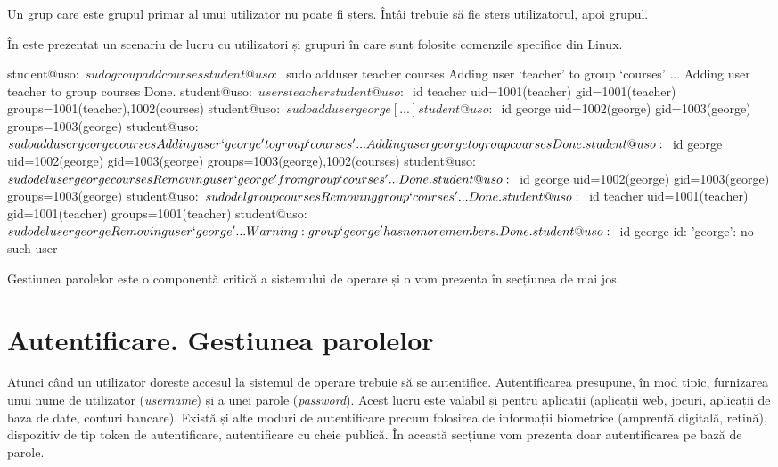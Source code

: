 Un grup care este grupul primar al unui utilizator nu poate fi șters. Întâi trebuie să fie șters utilizatorul, apoi grupul.

În  este prezentat un scenariu de lucru cu utilizatori și grupuri în care sunt
folosite comenzile specifice din Linux.

\begin{screen}[caption={Gestiunea utilizatorilor și grupurilor în Linux},label={lst:user:user-group-linux}]
student@uso:~$ sudo groupadd courses
student@uso:~$ sudo adduser teacher courses
Adding user `teacher' to group `courses' ...
Adding user teacher to group courses
Done.
student@uso:~$ users teacher
student@uso:~$ id teacher
uid=1001(teacher) gid=1001(teacher) groups=1001(teacher),1002(courses)
student@uso:~$ sudo adduser george
[...]
student@uso:~$ id george
uid=1002(george) gid=1003(george) groups=1003(george)
student@uso:~$ sudo adduser george courses
Adding user `george' to group `courses' ...
Adding user george to group courses
Done.
student@uso:~$ id george
uid=1002(george) gid=1003(george) groups=1003(george),1002(courses)
student@uso:~$ sudo deluser george courses
Removing user `george' from group `courses' ...
Done.
student@uso:~$ id george
uid=1002(george) gid=1003(george) groups=1003(george)
student@uso:~$ sudo delgroup courses
Removing group `courses' ...
Done.
student@uso:~$ id teacher
uid=1001(teacher) gid=1001(teacher) groups=1001(teacher)
student@uso:~$ sudo deluser george
Removing user `george' ...
Warning: group `george' has no more members.
Done.
student@uso:~$ id george
id: 'george': no such user
\end{screen}

Gestiunea parolelor este o componentă critică a sistemului de operare și o vom
prezenta în secțiunea de mai jos.

\section{Autentificare. Gestiunea parolelor}
\label{sec:user:auth}

Atunci când un utilizator dorește accesul la sistemul de operare trebuie să se
autentifice. Autentificarea presupune, în mod tipic, furnizarea unui nume de
utilizator (\textit{username}) și a unei parole (\textit{password}). Acest lucru este valabil și
pentru aplicații (aplicații web, jocuri, aplicații de baza de date, conturi
bancare). Există și alte moduri de autentificare precum folosirea de informații
biometrice (amprentă digitală, retină), dispozitiv de tip token de
autentificare, autentificare cu cheie publică. În această secțiune vom prezenta
doar autentificarea pe bază de parole.

